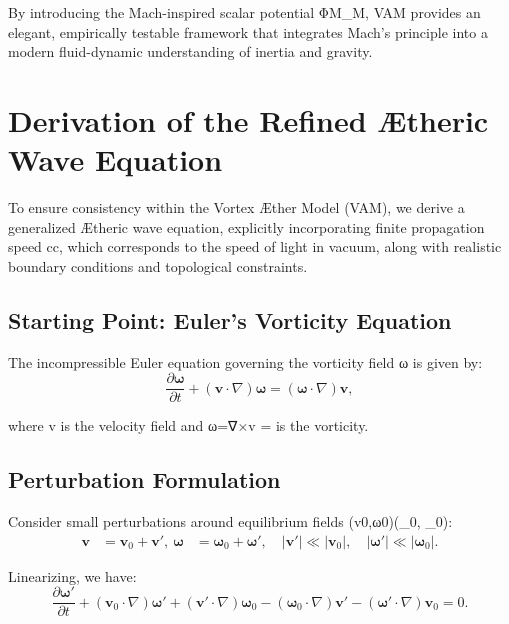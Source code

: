 \documentclass[aps,preprint,superscriptaddress]{revtex4-2}
\begin{document}
By introducing the Mach-inspired scalar potential ΦM\Phi_M, VAM provides an elegant, empirically testable framework that integrates Mach's principle into a modern fluid-dynamic understanding of inertia and gravity.




\section{Derivation of the Refined Ætheric Wave Equation}


To ensure consistency within the Vortex Æther Model (VAM), we derive a generalized Ætheric wave equation, explicitly incorporating finite propagation speed cc, which corresponds to the speed of light in vacuum, along with realistic boundary conditions and topological constraints.


\subsection{Starting Point: Euler's Vorticity Equation}


The incompressible Euler equation governing the vorticity field ω\boldsymbol{\omega} is given by:
\begin{equation}
\frac{\partial \boldsymbol{\omega}}{\partial t} + (\mathbf{v}\cdot\nabla)\boldsymbol{\omega} = (\boldsymbol{\omega}\cdot\nabla)\mathbf{v},
\end{equation}


where v is the velocity field and ω=∇×v\boldsymbol{\omega} = \nabla \times {} is the vorticity.


\subsection{Perturbation Formulation}


Consider small perturbations around equilibrium fields (v0,ω0)(_0, \boldsymbol{\omega}_0):
\begin{align}
\mathbf{v} &= \mathbf{v}_0 + \mathbf{v}',\
\boldsymbol{\omega} &= \boldsymbol{\omega}_0 + \boldsymbol{\omega}', \quad |\mathbf{v}'| \ll |\mathbf{v}_0|, \quad |\boldsymbol{\omega}'| \ll |\boldsymbol{\omega}_0|.
\end{align}


Linearizing, we have:
\begin{equation}
\frac{\partial \boldsymbol{\omega}'}{\partial t} + (\mathbf{v}_0 \cdot \nabla)\boldsymbol{\omega}' + (\mathbf{v}' \cdot \nabla)\boldsymbol{\omega}_0 - (\boldsymbol{\omega}_0\cdot\nabla)\mathbf{v}' - (\boldsymbol{\omega}'\cdot\nabla)\mathbf{v}_0 = 0.
\end{equation}
\end{document}
